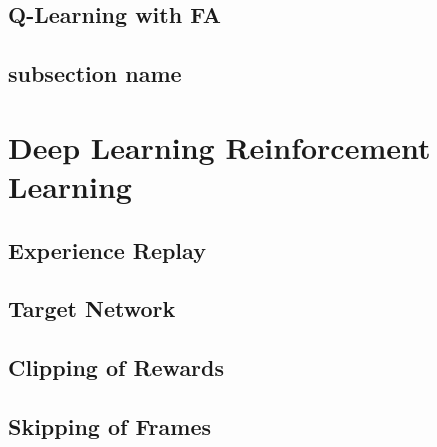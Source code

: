 	
	\subsection{Q-Learning with FA} %
	\label{sub:q_learning_with_fa}
	
	
	\subsection{subsection name} %
	\label{sub:subsection_name}
	

\section{Deep Learning Reinforcement Learning} %
	\label{sec:deep_learning_reinforcement_learning}

	\subsection{Experience Replay} %
		\label{sub:experience_replay}
	
	\subsection{Target Network} %
		\label{sub:target_network}
	
	\subsection{Clipping of Rewards} %
		\label{sub:clipping_of_rewards}
	
	\subsection{Skipping of Frames} %
	\label{sub:skipping_of_frames}
	
